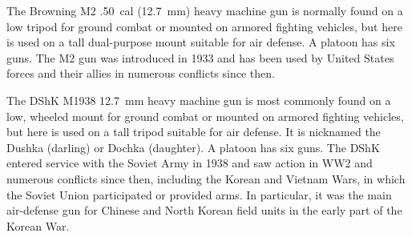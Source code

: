 \begin{withcounters}


    The Browning M2 .50~cal (12.7~mm) heavy machine gun is normally found on a low tripod for ground combat or mounted on armored fighting vehicles, but here is used on a tall dual-purpose mount suitable for air defense. A platoon has six guns.
    The M2 gun was introduced in 1933 and has been used by United States forces and their allies in numerous conflicts since then.%


    The DShK M1938 12.7~mm heavy machine gun is most commonly found on a low, wheeled mount for ground combat or mounted on armored fighting vehicles, but here is used on a tall tripod suitable for air defense. It is nicknamed the Dushka (darling) or Dochka (daughter). A platoon has six guns.
    The DShK entered service with the Soviet Army in 1938 and saw action in WW2 and numerous conflicts since then, including the Korean and Vietnam Wars, in which the Soviet Union participated or provided arms. In particular, it was the main air-defense gun for Chinese and North Korean field units in the early part of the Korean War.%
\end{withcounters}
